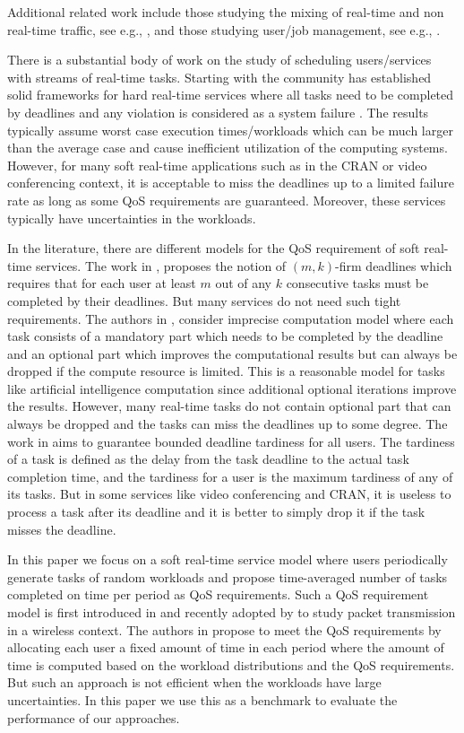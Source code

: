 \documentclass[prodmode,acmtompecs]{acmsmall}
\newcommand{\myComments}[1]{}
\newif\ifdissertation
\newcommand{\dissertationStart}{\ifdissertation  \myComments{Dissertation version: }}
\begin{document}
Additional related work include those studying the mixing of real-time and non real-time traffic, see e.g., \cite{ShS01,JaS11,PaD07}, 
and those studying user/job management, see e.g., 
\cite{AAB00,MTH11,DeK14}. 

\dissertationStart
There is a substantial body of work on the study of scheduling users/services with streams of real-time tasks. 
Starting with \cite{LiL73A} the community has established solid frameworks for hard real-time services where all tasks need to be completed by deadlines and any violation is considered as a system failure \cite{Liu00b} \cite{DaB11A}. The results typically assume worst case execution times/workloads which can be much larger than the average case and cause inefficient utilization of the computing systems. However, for many soft real-time applications such as in the CRAN or video conferencing context, it is acceptable to miss the deadlines up to a limited failure rate as long as some QoS requirements are guaranteed. Moreover, these services typically have uncertainties in the workloads. 

In the literature, there are different models for the QoS requirement of soft real-time services. The work in \cite{HaR95A}, \cite{BeB97A} proposes the notion of $(m, k)$-firm deadlines which requires that for each user at least $m$ out of any $k$ consecutive tasks must be completed by their deadlines. But many services do not need such tight requirements. The authors in \cite{LLN87A}, \cite{HoK13bA} consider imprecise computation model where each task consists of a mandatory part which needs to be completed by the deadline and an optional part which improves the computational results but can always be dropped if the compute resource is limited. This is a reasonable model for tasks like artificial intelligence computation since additional optional iterations improve the results. However, many real-time tasks do not contain optional part that can always be dropped and the tasks can miss the deadlines up to some degree. The work in \cite{LiA09A} aims to guarantee bounded deadline tardiness for all users. The tardiness of a task is defined as the delay from the task deadline to the actual task completion time, and the tardiness for a user is the maximum tardiness of any of its tasks. But in some services like video conferencing and CRAN, it is useless to process a task after its deadline and it is better to simply drop it if the task misses the deadline. 

In this paper we focus on a soft real-time service model where users periodically generate tasks of random workloads and propose time-averaged number of tasks completed on time per period as QoS requirements. Such a QoS requirement model is first introduced in \cite{AtB98A} and recently adopted by \cite{HoK13bA} \cite{HoK12A} to study packet transmission in a wireless context. The authors in \cite{AtB98A} propose to meet the QoS requirements by allocating each user a fixed amount of time in each period where the amount of time is computed based on the workload distributions and the QoS requirements. But such an approach is not efficient when the workloads have large uncertainties. In this paper we use this as a benchmark to evaluate the performance of our approaches. 
\end{document}
